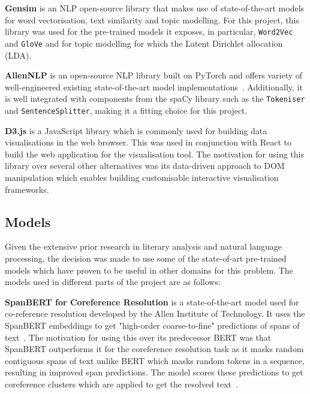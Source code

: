 \textbf{Gensim} is an NLP open-source library that makes use of state-of-the-art models for word vectorisation, text similarity and topic modelling. For this project, this library was used for the pre-trained models it exposes, in particular, \texttt{Word2Vec} and \texttt{GloVe} and for topic modelling for which the Latent Dirichlet allocation (LDA). 

\textbf{AllenNLP} is an open-source NLP library built on PyTorch and offers variety of well-engineered existing state-of-the-art model implementations~\cite{allennlp}. Additionally, it is well integrated with components from the spaCy library such as the \texttt{Tokeniser} and \texttt{SentenceSplitter}, making it a fitting choice for this project. 

\textbf{D3.js} is a JavaScript library which is commonly used for building data visualisations in the web browser. This was used in conjunction with React to build the web application for the visualisation tool. The motivation for using this library over several other alternatives was its data-driven approach to DOM manipulation which enables building customisable interactive visualisation frameworks. 


\subsection{Models} \label{s:models}

Given the extensive prior research in literary analysis and natural language processing, the decision was made to use some of the state-of-art pre-trained models which have proven to be useful in other domains for this problem. The models used in different parts of the project are as follows: 

\textbf{SpanBERT for Coreference Resolution} is a state-of-the-art model used for co-reference resolution developed by the Allen Institute of Technology. It uses the SpanBERT embeddings to get "high-order coarse-to-fine" predictions of spans of text~\cite{spanBERT}. The motivation for using this over its predecessor BERT was that SpanBERT outperforms it for the coreference resolution task as it masks random contiguous spans of text unlike BERT which masks random tokens in a sequence, resulting in improved span predictions. The model scores these predictions to get coreference clusters which are applied to get the resolved text~\cite{spanBERT}.

